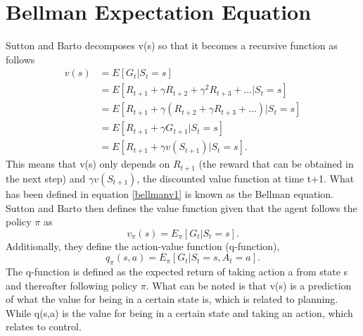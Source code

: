 \section{Bellman Expectation Equation}
Sutton and Barto \cite{sutton_barto} decomposes v(s) so that it becomes a recursive function as follows
\begin{align}
	v(s) &= E[G_t | S_t = s]\\
	&= E[R_{t+1} + \gamma R_{t+2} + \gamma^{2} R_{t+3} + ...|S_t = s]\\
	&= E[R_{t+1} + \gamma (R_{t+2} + \gamma R_{t+3} + ...)|S_t = s]\\
	&= E[R_{t+1} + \gamma G_{t+1}|S_t = s]\\
	&= E[R_{t+1} + \gamma v(S_{t+1})|S_t = s].
	\label{bellmanv1}
\end{align}
This means that v(s) only depends on $R_{t+1}$ (the reward that can be obtained in the next step) and $\gamma v(S_{t+1})$, the discounted value function at time t+1.
What has been defined in equation \ref{bellmanv1} is known as the Bellman equation.\cite{sutton_barto}
Sutton and Barto then defines the value function given that the agent follows the policy $\pi$ as
\begin{equation}
	v_{\pi}(s) = E_{\pi}[G_t | S_t = s].
\end{equation}
Additionally, they define the action-value function (q-function),
\begin{equation}
	q_{\pi}(s,a) = E_{\pi}[G_t | S_t = s,A_t = a].
\end{equation}
The q-function is defined as the expected return of taking action a from state s and thereafter following policy $\pi$. What can be noted is that v(s) is a prediction of what the value for being in a certain state is, which is related to planning. While q(s,a) is the value for being in a certain state and taking an action, which relates to control. 

